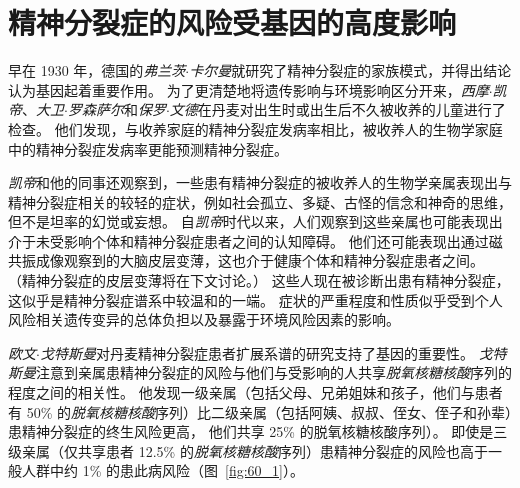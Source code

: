 \section{精神分裂症的风险受基因的高度影响}

早在 1930 年，德国的\textit{弗兰茨$\cdot$卡尔曼}就研究了精神分裂症的家族模式，并得出结论认为基因起着重要作用。
为了更清楚地将遗传影响与环境影响区分开来，\textit{西摩$\cdot$凯帝}、\textit{大卫$\cdot$罗森萨尔}和\textit{保罗$\cdot$文德}在丹麦对出生时或出生后不久被收养的儿童进行了检查。
他们发现，与收养家庭的精神分裂症发病率相比，被收养人的生物学家庭中的精神分裂症发病率更能预测精神分裂症。


\textit{凯帝}和他的同事还观察到，一些患有精神分裂症的被收养人的生物学亲属表现出与精神分裂症相关的较轻的症状，例如社会孤立、多疑、古怪的信念和神奇的思维，但不是坦率的幻觉或妄想。
自\textit{凯帝}时代以来，人们观察到这些亲属也可能表现出介于未受影响个体和精神分裂症患者之间的认知障碍。
他们还可能表现出通过磁共振成像观察到的大脑皮层变薄，这也介于健康个体和精神分裂症患者之间。 
（精神分裂症的皮层变薄将在下文讨论。）
这些人现在被诊断出患有精神分裂症，这似乎是精神分裂症谱系中较温和的一端。
症状的严重程度和性质似乎受到个人风险相关遗传变异的总体负担以及暴露于环境风险因素的影响。


\textit{欧文$\cdot$戈特斯曼}对丹麦精神分裂症患者扩展系谱的研究支持了基因的重要性。
\textit{戈特斯曼}注意到亲属患精神分裂症的风险与他们与受影响的人共享\textit{脱氧核糖核酸}序列的程度之间的相关性。
他发现一级亲属（包括父母、兄弟姐妹和孩子，他们与患者有 50\% 的\textit{脱氧核糖核酸}序列）比二级亲属（包括阿姨、叔叔、侄女、侄子和孙辈）患精神分裂症的终生风险更高， 他们共享 25\% 的脱氧核糖核酸序列）。
即使是三级亲属（仅共享患者 12.5\% 的\textit{脱氧核糖核酸}序列）患精神分裂症的风险也高于一般人群中约 1\% 的患此病风险（图~\ref{fig:60_1}）。


